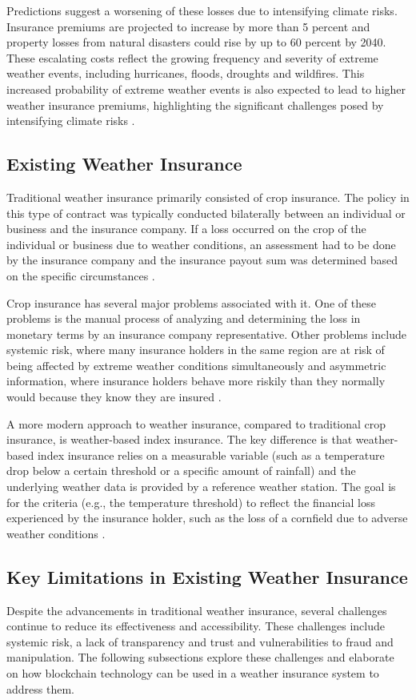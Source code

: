 Predictions suggest a worsening of these losses due to intensifying climate risks. Insurance premiums are projected to increase by more than 5 percent and property losses from natural disasters could rise by up to 60 percent by 2040. These escalating costs reflect the growing frequency and severity of extreme weather events, including hurricanes, floods, droughts and wildfires. This increased probability of extreme weather events is also expected to lead to higher weather insurance premiums, highlighting the significant challenges posed by intensifying climate risks \autocites{cho2022climate}{tucker1997climate}.

\subsection{Existing Weather Insurance}
Traditional weather insurance primarily consisted of crop insurance. The policy in this type of contract was typically conducted bilaterally between an individual or business and the insurance company. If a loss occurred on the crop of the individual or business due to weather conditions, an assessment had to be done by the insurance company and the insurance payout sum was determined based on the specific circumstances \autocite{michler2022risk}.

Crop insurance has several major problems associated with it. One of these problems is the manual process of analyzing and determining the loss in monetary terms by an insurance company representative. Other problems include systemic risk, where many insurance holders in the same region are at risk of being affected by extreme weather conditions simultaneously and asymmetric information, where insurance holders behave more riskily than they normally would because they know they are insured \autocite{makki2002crop}.

\sloppy A more modern approach to weather insurance, compared to traditional crop insurance, is weather-based index insurance. The key difference is that weather-based index insurance relies on a measurable variable (such as a temperature drop below a certain threshold or a specific amount of rainfall) and the underlying weather data is provided by a reference weather station. The goal is for the criteria (e.g., the temperature threshold) to reflect the financial loss experienced by the insurance holder, such as the loss of a cornfield due to adverse weather conditions \autocite{kajwang2022weather}.

\subsection{Key Limitations in Existing Weather Insurance}\label{section:key_limitations_existing_insurance}
Despite the advancements in traditional weather insurance, several challenges continue to reduce its effectiveness and accessibility. These challenges include systemic risk, a lack of transparency and trust and vulnerabilities to fraud and manipulation. The following subsections explore these challenges and elaborate on how blockchain technology can be used in a weather insurance system to address them.

